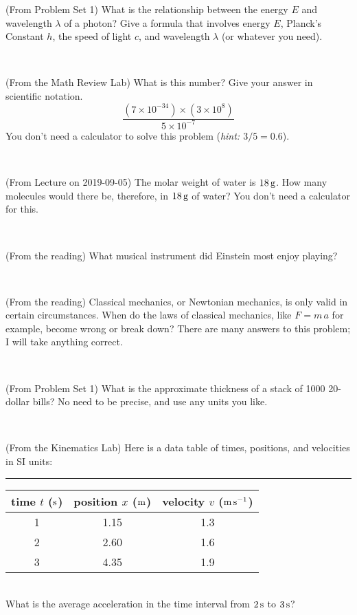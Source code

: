 \documentclass[12pt, letterpaper]{article}
\begin{document}
\begin{problem} (From Problem Set 1)
What is the relationship between the energy $E$ and wavelength
$\lambda$ of a photon? Give a formula that involves energy $E$,
Planck's Constant $h$, the speed of light $c$, and wavelength
$\lambda$ (or whatever you need).
\end{problem}

\vfill ~

\begin{problem} (From the Math Review Lab)
What is this number? Give your answer in scientific notation.
$$
\frac{(7\times10^{-34})\times(3\times10^8)}{5\times10^{-7}}
$$
You don't need a calculator to solve this problem (\textit{hint: $3/5=0.6$}).
\end{problem}


\vfill ~

\begin{problem} (From Lecture on 2019-09-05)
The molar weight of water is $18\,\mathrm{g}$. How many molecules would there
be, therefore, in $18\,\mathrm{g}$ of water? You don't need a calculator for
this.
\end{problem}


\vfill ~

\begin{problem} (From the reading)
What musical instrument did Einstein most enjoy playing?
\end{problem}


\vfill ~


\clearpage


\begin{problem} (From the reading)
Classical mechanics, or Newtonian mechanics, is only valid in certain
circumstances. When do the laws of classical mechanics, like $F =
m\,a$ for example, become wrong or break down? There are many answers
to this problem; I will take anything correct.
\end{problem}


\vfill ~

\begin{problem} (From Problem Set 1)
What is the approximate thickness of a stack of 1000 20-dollar bills?
No need to be precise, and use any units you like.
\end{problem}


\vfill ~

\begin{problem} (From the Kinematics Lab)
Here is a data table of times, positions, and velocities in SI units:\\
\rule{1.0in}{0pt}\begin{tabular}{c|c|c}
time $t$ ($\mathrm{s}$) & position $x$ ($\mathrm{m}$) & velocity $v$ ($\mathrm{m}\,\mathrm{s}^{-1}$) \\
\hline
1 & 1.15 & 1.3 \\
2 & 2.60 & 1.6 \\
3 & 4.35 & 1.9 \\
\hline
\end{tabular}\\
What is the average acceleration in the time interval from $2\,\mathrm{s}$ to $3\,\mathrm{s}$?
\end{problem}
\end{document}
